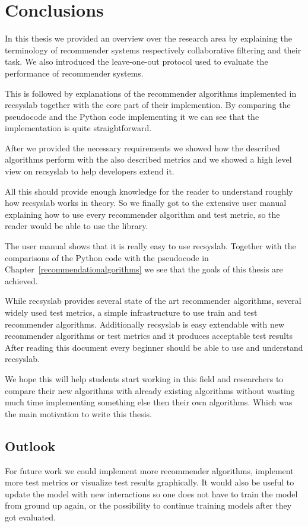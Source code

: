
\chapter{Conclusions}
\label{conclusions}
In this thesis we provided an overview over the research area by
explaining the terminology of recommender systems respectively
collaborative filtering and their task. We also introduced the leave-one-out
protocol used to evaluate the performance of recommender systems.

This is followed by explanations of the recommender algorithms implemented in recsyslab
together with the core part of their implemention. By comparing the pseudocode
and the Python code implementing it we can see that the implementation is quite
straightforward.

After we provided the necessary requirements we showed how the described algorithms
perform with the also described metrics and we showed a high level view on 
recsyslab to help developers extend it.

All this should provide enough knowledge for
the reader to understand roughly how recsyslab works in theory.
So we finally got to the extensive user manual 
explaining how to use every recommender algorithm and test metric, so the reader
would be able to use the library.

The user manual shows that it is really easy to use recsyslab.
Together with the comparisons of the Python code with the pseudocode
in Chapter~\ref{recommendationalgorithms} we see that the goals of
this thesis are achieved.

While recsyslab provides several state of the art recommender algorithms,
several widely used test metrics, a simple infrastructure to use train and test
recommender algorithms. Additionally recsyslab is easy extendable with new 
recommender algorithms or test metrics and it produces acceptable test results
After reading this document every beginner should be able to use and understand recsyslab.

We hope this will help students start working in this field and researchers to compare their new algorithms
with already existing algorithms without wasting much time implementing something else
then their own algorithms. Which was the main motivation to write this thesis.


\section{Outlook}
For future work we could implement more recommender algorithms,
implement more test metrics or visualize test results graphically.
It would also be useful to update the model with new interactions so 
one does not have to train the model from ground up again, or the 
possibility to continue training models after they got evaluated.

